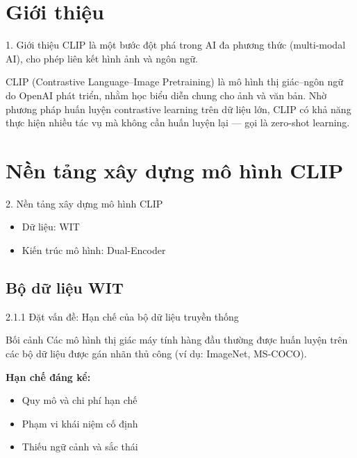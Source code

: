 \section{Giới thiệu}

\begin{frame}{1. Giới thiệu}
CLIP là một bước đột phá trong AI đa phương thức (multi-modal AI), cho phép liên kết hình ảnh và ngôn ngữ.

\bigskip

CLIP (Contrastive Language–Image Pretraining) là mô hình thị giác–ngôn ngữ do OpenAI phát triển, nhằm học biểu diễn chung cho ảnh và văn bản. Nhờ phương pháp huấn luyện contrastive learning trên dữ liệu lớn, CLIP có khả năng thực hiện nhiều tác vụ mà không cần huấn luyện lại — gọi là zero-shot learning.
\end{frame}

\section{Nền tảng xây dựng mô hình CLIP}
\begin{frame}{2. Nền tảng xây dựng mô hình CLIP}
    \begin{itemize}
        \item Dữ liệu: WIT
        \item Kiến trúc mô hình: Dual-Encoder
    \end{itemize}
\end{frame}

\subsection{Bộ dữ liệu WIT}
\begin{frame}{2.1.1 Đặt vấn đề: Hạn chế của bộ dữ liệu truyền thống}
    \begin{block}{Bối cảnh}
        Các mô hình thị giác máy tính hàng đầu thường được huấn luyện trên các bộ dữ liệu được gán nhãn thủ công (ví dụ: ImageNet, MS-COCO).
    \end{block}

    \textbf{Hạn chế đáng kể:}
    \begin{itemize}
        \item Quy mô và chi phí hạn chế
        \item Phạm vi khái niệm cố định
        \item Thiếu ngữ cảnh và sắc thái
    \end{itemize}
\end{frame}

